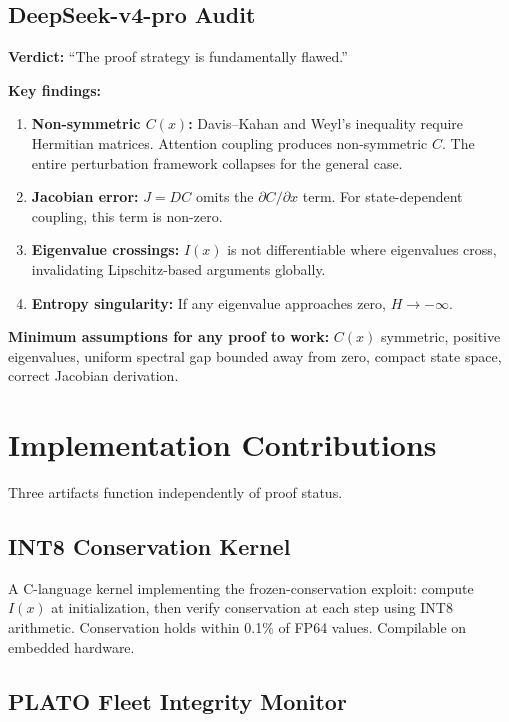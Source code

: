 \documentclass[11pt]{article}
\begin{document}
\subsection{DeepSeek-v4-pro Audit}

\textbf{Verdict:} ``The proof strategy is fundamentally flawed.''

\textbf{Key findings:}
\begin{enumerate}
  \item \textbf{Non-symmetric $C(x)$:} Davis--Kahan and Weyl's inequality require Hermitian matrices. Attention coupling produces non-symmetric $C$. The entire perturbation framework collapses for the general case.
  \item \textbf{Jacobian error:} $J = DC$ omits the $\partial C / \partial x$ term. For state-dependent coupling, this term is non-zero.
  \item \textbf{Eigenvalue crossings:} $I(x)$ is not differentiable where eigenvalues cross, invalidating Lipschitz-based arguments globally.
  \item \textbf{Entropy singularity:} If any eigenvalue approaches zero, $H \to -\infty$.
\end{enumerate}

\textbf{Minimum assumptions for any proof to work:} $C(x)$ symmetric, positive eigenvalues, uniform spectral gap bounded away from zero, compact state space, correct Jacobian derivation.

\section{Implementation Contributions}

Three artifacts function independently of proof status.

\subsection{INT8 Conservation Kernel}

A C-language kernel implementing the frozen-conservation exploit: compute $I(x)$ at initialization, then verify conservation at each step using INT8 arithmetic. Conservation holds within 0.1\% of FP64 values. Compilable on embedded hardware.

\subsection{PLATO Fleet Integrity Monitor}
\end{document}
